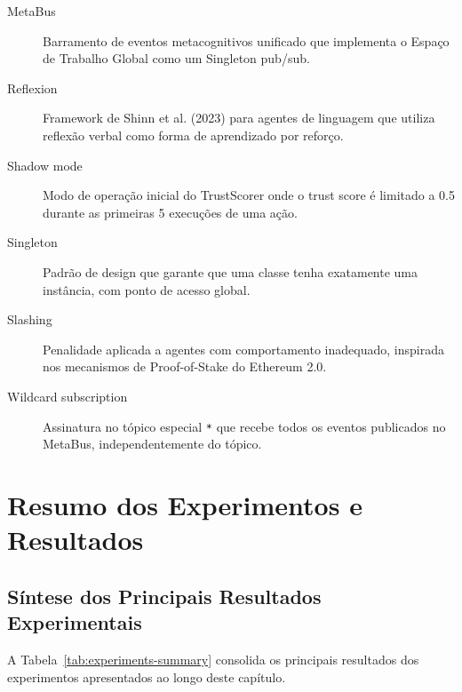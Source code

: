 \begin{description}
    \item[MetaBus] Barramento de eventos metacognitivos unificado que implementa o Espaço de Trabalho Global como um Singleton pub/sub.
    
    \item[Reflexion] Framework de Shinn et al. (2023) para agentes de linguagem que utiliza reflexão verbal como forma de aprendizado por reforço. \cite{Shinn2023_Reflexion}
    
    \item[Shadow mode] Modo de operação inicial do TrustScorer onde o trust score é limitado a 0.5 durante as primeiras 5 execuções de uma ação.
    
    \item[Singleton] Padrão de design que garante que uma classe tenha exatamente uma instância, com ponto de acesso global. \cite{Gamma1994_DesignPatterns}
    
    \item[Slashing] Penalidade aplicada a agentes com comportamento inadequado, inspirada nos mecanismos de Proof-of-Stake do Ethereum 2.0. \cite{Buterin2020_Eth2}
    
    \item[Wildcard subscription] Assinatura no tópico especial \texttt{*} que recebe todos os eventos publicados no MetaBus, independentemente do tópico.
    
\end{description}

\section{Resumo dos Experimentos e Resultados}
\label{sec:experiments-summary}

\subsection{Síntese dos Principais Resultados Experimentais}

A Tabela~\ref{tab:experiments-summary} consolida os principais resultados dos experimentos apresentados ao longo deste capítulo.

